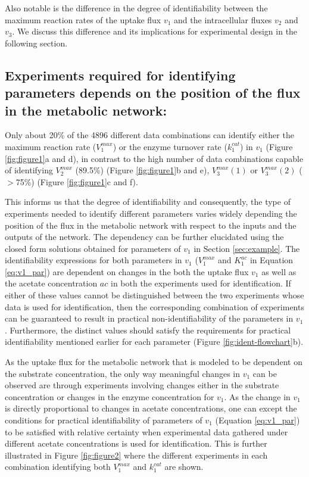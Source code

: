 \documentclass[10pt]{article}
\begin{document}
{Also notable is the difference in the degree of identifiability between the maximum reaction rates of the uptake flux $v_1$ and the intracellular fluxes $v_2$ and $v_3$. We discuss this difference and its implications for experimental design in the following section.

\subsection{Experiments required for identifying parameters depends on the position of the flux in the metabolic network:}
Only about 20\% of the 4896 different data combinations can identify either the maximum reaction rate ($V_1^{max}$) or the enzyme turnover rate ($k_1^{cat}$) in $v_1$ (Figure \ref{fig:figure1}a and d), in contrast to the high number of data combinations capable of identifying $V_2^{max}$ (89.5\%) (Figure \ref{fig:figure1}b and e), $V_3^{max} (1)$ or $V_3^{max} (2)$ ($>$75\%) (Figure \ref{fig:figure1}c and f). 

This informs us that the degree of identifiability and consequently, the type of experiments needed to identify different parameters varies widely depending the position of the flux in the metabolic network with respect to the inputs and the outputs of the network. The dependency can be further elucidated using the closed form solutions obtained for parameters of $v_1$ in Section \ref{sec:example}. The identifiability expressions for both parameters in $v_1$ ($V_1^{max}$ and $K_1^{ac}$ in Equation \ref{eq:v1_par}) are dependent on changes in the both the uptake flux $v_1$ as well as the acetate concentration $ac$ in both the experiments used for identification. If either of these values cannot be distinguished between the two experiments whose data is used for identification, then the corresponding combination of experiments can be guaranteed to result in practical non-identifiability of the parameters in $v_1$. Furthermore, the distinct values should satisfy the requirements for practical identifiability mentioned earlier for each parameter (Figure \ref{fig:ident-flowchart}b). 

As the uptake flux for the metabolic network that is modeled to be dependent on the substrate concentration, the only way meaningful changes in $v_1$ can be observed are through experiments involving changes either in the substrate concentration or changes in the enzyme concentration for $v_1$. As the change in $v_1$ is directly proportional to changes in acetate concentrations, one can except the conditions for practical identifiability of parameters of $v_1$ (Equation \ref{eq:v1_par}) to be satisfied with relative certainty when experimental data gathered under different acetate concentrations is used for identification. This is further illustrated in Figure \ref{fig:figure2} where the different experiments in each combination identifying both $V_1^{max}$ and $k_1^{cat}$ are shown. 


}
\end{document}
